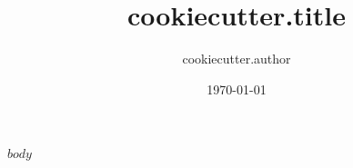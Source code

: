 \documentclass[12pt,a4paper]{book}
\title{ {{cookiecutter.title}} }
\author{ {{cookiecutter.author}} }
\date{\today}
\begin{document}
\frontmatter
\maketitle
\tableofcontents

\mainmatter
$body$

\backmatter
\printbibliography
\end{document}
